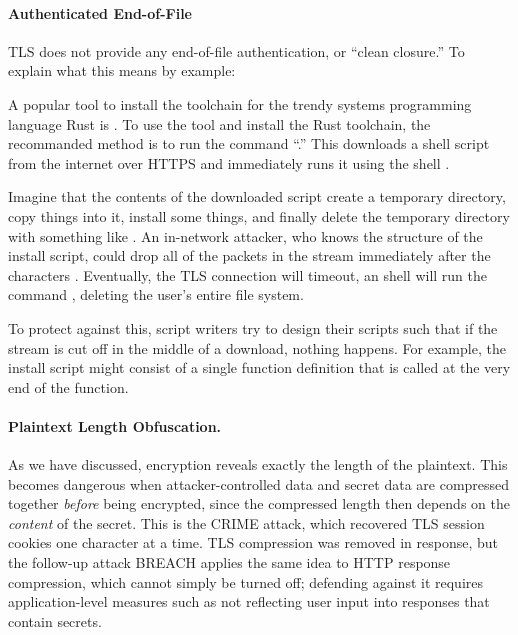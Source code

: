 \paragraph{Authenticated End-of-File}
TLS does not provide any end-of-file authentication,
or ``clean closure.''
To explain what this means by example:

A popular tool to install the toolchain for the trendy systems programming language Rust is . To use the tool and install the Rust toolchain, the recommanded method is to run the 
command ``.''
This downloads a shell script from the internet 
over HTTPS and immediately runs it using the shell .

Imagine that the contents of the downloaded script
create a temporary directory, copy things into it,
install some things, and finally delete the
temporary directory with something like .
An in-network attacker, who knows the structure of the 
install script, could drop all of the packets in the stream immediately
after the characters .
Eventually, the TLS connection will timeout, an shell will run
the command , deleting the user's entire file system.

To protect against this, script writers try to
design their scripts such that if the stream is
cut off in the middle of a download, nothing happens.
For example, the install script might consist of a 
single function definition that is called at the very 
end of the function.

\paragraph{Plaintext Length Obfuscation.}
As we have discussed, encryption reveals exactly the length of the
plaintext.  This becomes dangerous when attacker-controlled data and
secret data are compressed together \emph{before} being encrypted, since
the compressed length then depends on the \emph{content} of the secret.
This is the CRIME attack\autocite{crime}, which recovered TLS session
cookies one character at a time.
TLS compression was removed in response, but the follow-up
attack BREACH\autocite{breach} applies the same idea to HTTP response
compression, which cannot simply be turned off; defending against it
requires application-level measures such as not reflecting user input
into responses that contain secrets.
